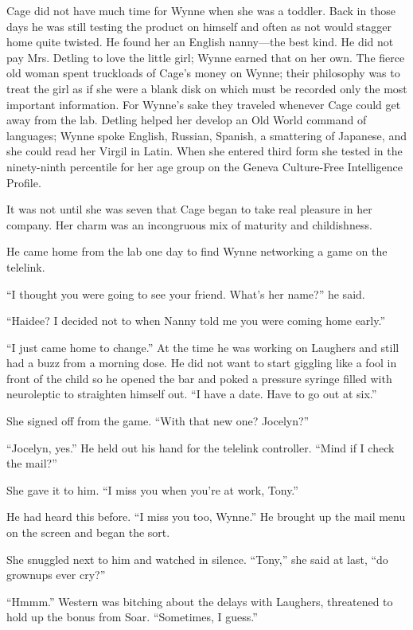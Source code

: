 Cage did not have much time for Wynne when she was a toddler. Back in those days he was still testing the product on himself and often as not would stagger home quite twisted. He found her an English nanny---the best kind. He did not pay Mrs. Detling to love the little girl; Wynne earned that on her own. The fierce old woman spent truckloads of Cage's money on Wynne; their philosophy was to treat the girl as if she were a blank disk on which must be recorded only the most important information. For Wynne's sake they traveled whenever Cage could get away from the lab. Detling helped her develop an Old World command of languages; Wynne spoke English, Russian, Spanish, a smattering of Japanese, and she could read her Virgil in Latin. When she entered third form she tested in the ninety-ninth percentile for her age group on the Geneva Culture-Free Intelligence Profile.

It was not until she was seven that Cage began to take real pleasure in her company. Her charm was an incongruous mix of maturity and childishness.

He came home from the lab one day to find Wynne networking a game on the telelink.

``I thought you were going to see your friend. What's her name?'' he said.

``Haidee? I decided not to when Nanny told me you were coming home early.''

``I just came home to change.'' At the time he was working on Laughers and still had a buzz from a morning dose. He did not want to start giggling like a fool in front of the child so he opened the bar and poked a pressure syringe filled with neuroleptic to straighten himself out. ``I have a date. Have to go out at six.''

She signed off from the game. ``With that new one? Jocelyn?''

``Jocelyn, yes.'' He held out his hand for the telelink controller. ``Mind if I check the mail?''

She gave it to him. ``I miss you when you're at work, Tony.''

He had heard this before. ``I miss you too, Wynne.'' He brought up the mail menu on the screen and began the sort.

She snuggled next to him and watched in silence. ``Tony,'' she said at last, ``do grownups ever cry?''

``Hmmm.'' Western was bitching about the delays with Laughers, threatened to hold up the bonus from Soar. ``Sometimes, I guess.''

